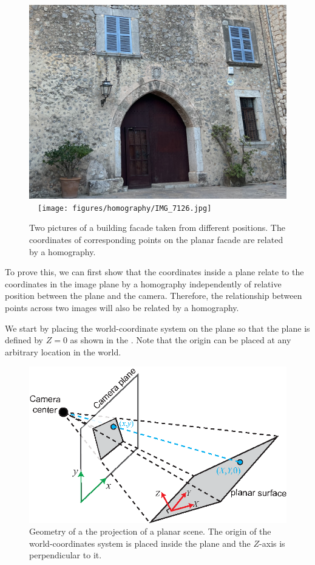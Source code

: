 \begin{figure}
\centerline{
\includegraphics[width=0.45\linewidth]{figures/homography/IMG_7127_crop.jpg}
~~\texttt{[image: figures/homography/IMG\_7126.jpg]}
}
\caption{Two pictures of a building facade taken from different positions. The coordinates of corresponding points on the planar facade are related by a homography.}
\label{fig:example_two_images_facade}
\end{figure}


To prove this, we can first show that the coordinates inside a plane relate to the coordinates in the image plane by a homography independently of relative position between the plane and the camera. Therefore, the relationship between points across two images will also be related by a homography. 



We start by placing the world-coordinate system on the plane so that the plane is defined by $Z=0$ as shown in the \fig{\ref{fig:homography_plane_geometry}}. Note that the origin can be placed at any arbitrary location in the world. 


\begin{figure}
\centerline{
\includegraphics[width=0.7\linewidth]{figures/homography/homography_plane_geometry2.eps}
}
\caption{Geometry of a the projection of a planar scene. The origin of the world-coordinates system is placed inside the plane and the $Z$-axis is perpendicular to it.}
\label{fig:homography_plane_geometry}
\end{figure}

